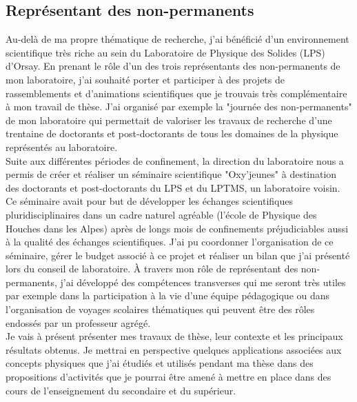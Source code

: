 \subsection{Représentant des non-permanents}
Au-delà de ma propre thématique de recherche, j'ai bénéficié d'un environnement scientifique très riche au sein du Laboratoire de Physique des Solides (LPS) d'Orsay. En prenant le rôle d'un des trois représentants des non-permanents de mon laboratoire, j'ai souhaité porter et participer à des projets de rassemblements et d'animations scientifiques que je trouvais très complémentaire à mon travail de thèse. J'ai organisé par exemple la "journée des non-permanents" de mon laboratoire qui permettait de valoriser les travaux de recherche d'une trentaine de doctorants et post-doctorants de tous les domaines de la physique représentés au laboratoire.\\

Suite aux différentes périodes de confinement, la direction du laboratoire nous a permis de créer et réaliser un séminaire scientifique "Oxy'jeunes" à destination des doctorants et post-doctorants du LPS et du LPTMS, un laboratoire voisin. Ce séminaire avait pour but de développer les échanges scientifiques pluridisciplinaires dans un cadre naturel agréable (l'école de Physique des Houches dans les Alpes) après de longs mois de confinements préjudiciables aussi à la qualité des échanges scientifiques. J'ai pu coordonner l'organisation de ce séminaire, gérer le budget associé à ce projet et réaliser un bilan que j'ai présenté lors du conseil de laboratoire. \`{A} travers mon rôle de représentant des non-permanents, j'ai développé des compétences transverses qui me seront très utiles par exemple dans la participation à la vie d'une équipe pédagogique ou dans l'organisation de voyages scolaires thématiques qui peuvent être des rôles endossés par un professeur agrégé. \\

Je vais à présent présenter mes travaux de thèse, leur contexte et les principaux résultats obtenus. Je mettrai en perspective quelques applications associées aux concepts physiques que j'ai étudiés et utilisés pendant ma thèse dans des propositions d'activités que je pourrai être amené à mettre en place dans des cours de l'enseignement du secondaire et du supérieur.
\vspace{2mm}